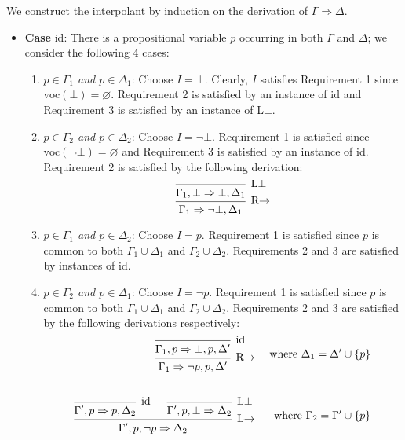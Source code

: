 \documentclass[a4paper]{article}
\newcommand{\voc}{\mathrm{voc}}
\newcommand{\id}{\mathrm{id}}
\begin{document}
We construct the interpolant by induction on the derivation of $\Gamma \Rightarrow \Delta$.
\begin{itemize}
\item \textbf{Case} $\id$: There is a propositional variable $p$ occurring in both $\Gamma$ and $\Delta$; we consider the following 4 cases:
  \begin{enumerate}
  \item \emph{$p \in \Gamma_1$ and $p \in \Delta_1$}: Choose $I = \bot$.
    Clearly, $I$ satisfies Requirement 1 since $\voc(\bot) = \varnothing$.
    Requirement 2 is satisfied by an instance of $\id$ and Requirement 3 is satisfied by an instance of L$\bot$.
  \item \emph{$p \in \Gamma_2$ and $p \in \Delta_2$}: Choose $I = \lnot\bot$.
    Requirement 1 is satisfied since $\voc(\lnot\bot) = \varnothing$ and Requirement 3 is satisfied by an instance of $\id$.
    Requirement 2 is satisfied by the following derivation:
    \[
      \begin{prooftree}
        \infer0[L$\bot$]{\Gamma_1,\bot \Rightarrow \bot,\Delta_1}
        \infer1[R$\to$]{\Gamma_1 \Rightarrow \lnot\bot,\Delta_1}
      \end{prooftree}
    \]
  \item \emph{$p \in \Gamma_1$ and $p \in \Delta_2$}: Choose $I = p$.
    Requirement 1 is satisfied since $p$ is common to both $\Gamma_1 \cup \Delta_1$ and $\Gamma_2 \cup \Delta_2$.
    Requirements 2 and 3 are satisfied by instances of $\id$.
  \item \emph{$p \in \Gamma_2$ and $p \in \Delta_1$}: Choose $I = \lnot p$.
    Requirement 1 is satisfied since $p$ is common to both $\Gamma_1 \cup \Delta_1$ and $\Gamma_2 \cup \Delta_2$.
    Requirements 2 and 3 are satisfied by the following derivations respectively:
    \begin{align*}
      \begin{prooftree}
        \infer0[$\id$]{\Gamma_1,p \Rightarrow \bot,p,\Delta'}
        \infer1[R$\to$]{\Gamma_1 \Rightarrow \lnot p,p,\Delta'}
      \end{prooftree}
      && \text{ where $\Delta_1 = \Delta' \cup \{p\}$}\\[2em]
      \begin{prooftree}
        \infer0[$\id$]{\Gamma',p \Rightarrow p, \Delta_2}
        \infer0[L$\bot$]{\Gamma',p,\bot \Rightarrow \Delta_2}
        \infer2[L$\to$]{\Gamma',p,\lnot p \Rightarrow \Delta_2}
      \end{prooftree}
      && \text{ where $\Gamma_2 = \Gamma' \cup \{p\}$}\\

\end{align*}
\end{enumerate}
\end{itemize}
\end{document}
